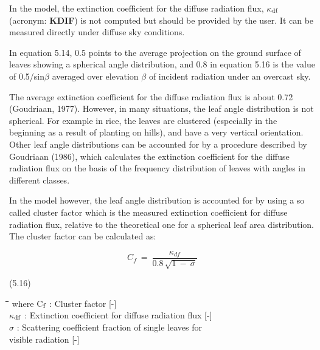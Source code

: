  
In the model, the extinction coefficient for the diffuse radiation flux, {\bf $\kappa$$_{{\rm df}}$} (acronym: {\bf KDIF})
is not computed but should be provided by the user. It can be {\nobreak}measured directly under
diffuse sky conditions.



In equation 5.14, 0.5 points to the average projection on the ground surface of leaves
showing a spherical angle distribution, and 0.8 in equation 5.16 is the value of 0.5/sin$\beta$
averaged over elevation $\beta$ of incident radiation under an overcast sky.








The average extinction coefficient for the diffuse radiation flux is about 0.72 (Goudri\-aan,
1977). However, in many situations, the leaf angle distribution is not spherical. For
example in rice, the leaves are clustered (especially in the beginning as a result of
planting on hills), and have a very vertical orientation. Other leaf angle distributions can
be accounted for by a procedure described by Goudriaan (1986), which calculates the
extinction coefficient for the diffuse radiation flux on the basis of the frequency distribu\-tion of leaves with angles in different classes.



In the model however, the leaf angle distribution is accounted for by using a so called
cluster factor which is the measured extinction coefficient for diffuse radiation flux,
relative to the theoreti\-cal one for a spherical leaf area distribution. The cluster factor can
be calculated as: 

\begin{displaymath}
C _{f} ~=~{\frac{ \kappa _{df} }{0.8\, \sqrt{1 ~-~ \sigma } }}
\end{displaymath}

 
\strut\hfill (5.16)

\nwln
\begin{tabbing}
\hspace{1.27cm}\=\hspace{1.27cm}\=\hspace{1.27cm}\=\hspace{1.27cm}\=%
\hspace{1.27cm}\=\hspace{1.27cm}\=\hspace{1.27cm}\=\hspace{1.27cm}\=%
\hspace{1.27cm}\=\hspace{1.27cm}\=\kill
where C$_{{\rm f}}$ : Cluster factor        [-]\\
$\kappa$$_{{\rm df}}$ : Extinction coefficient for diffuse radiation flux        [-]\\
$\sigma$ : Scattering coefficient fraction of single leaves for\\
   visible radiation        [-]
\end{tabbing}




